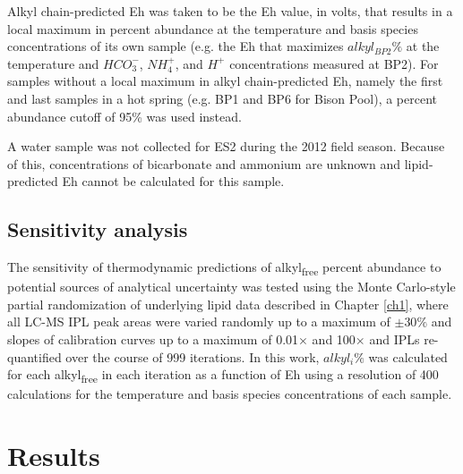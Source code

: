 Alkyl chain-predicted Eh was taken to be the Eh value, in volts, that results in a local maximum in percent abundance at the temperature and basis species concentrations of its own sample (e.g. the Eh that maximizes $alkyl_{BP2}\%$ at the temperature and $HCO_{3}^{-}$, $NH_{4}^{+}$, and $H^{+}$ concentrations measured at BP2). For samples without a local maximum in alkyl chain-predicted Eh, namely the first and last samples in a hot spring (e.g. BP1 and BP6 for Bison Pool), a percent abundance cutoff of 95\% was used instead.

A water sample was not collected for ES2 during the 2012 field season. Because of this, concentrations of bicarbonate and ammonium are unknown and lipid-predicted Eh cannot be calculated for this sample.


\subsection{Sensitivity analysis} The sensitivity of thermodynamic predictions of alkyl\textsubscript{free} percent abundance to potential sources of analytical uncertainty was tested using the Monte Carlo-style partial randomization of underlying lipid data described in Chapter \ref{ch1}, where all LC-MS IPL peak areas were varied randomly up to a maximum of $\pm30\%$ and slopes of calibration curves up to a maximum of 0.01$\times$ and 100$\times$ and IPLs re-quantified over the course of 999 iterations. In this work, $alkyl_{i}\%$ was calculated for each alkyl\textsubscript{free} in each iteration as a function of Eh using a resolution of 400 calculations for the temperature and basis species concentrations of each sample.


\section{Results}


